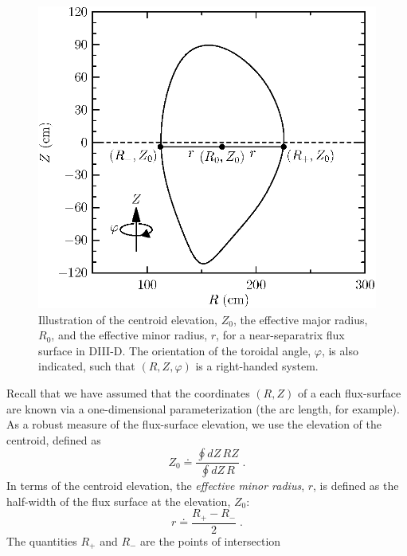 \begin{figure}
\begin{center}
\includegraphics[scale=0.8]{figures/surf.eps}
\caption{Illustration of the centroid elevation, $Z_0$, 
the effective major radius, $R_0$, and the effective 
minor radius, $r$, for a near-separatrix flux surface 
in DIII-D.  The 
orientation of the toroidal angle, $\varphi$, is also 
indicated, such that $(R,Z,\varphi)$ is a right-handed 
system.}
\label{fig.surf}
\end{center}
\end{figure}
%
Recall that we have assumed that the coordinates $(R,Z)$ 
of a each flux-surface are known via a one-dimensional 
parameterization (the arc length, for example).  As 
a robust measure of the flux-surface elevation, we 
use the elevation of the centroid, defined as
%
\begin{equation}
Z_0 \doteq 
 \frac{\displaystyle\oint dZ\, R Z}{\displaystyle\oint dZ\, R} \; .
\end{equation}
%
In terms of the centroid elevation, the {\it effective minor 
radius}, $r$, is defined as the half-width of the 
flux surface at the elevation, $Z_0$:
%
\begin{equation}
r \doteq \frac{R_+-R_-}{2} \; .
\label{eq.rmin}
\end{equation}
%
The quantities $R_+$ and $R_-$ are the points of intersection
